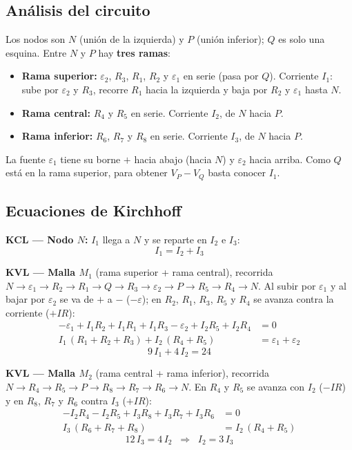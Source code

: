 \documentclass[12pt,letterpaper]{article}
\begin{document}
\subsection*{An\'alisis del circuito}

Los nodos son $N$ (uni\'on de la izquierda) y $P$ (uni\'on inferior); $Q$ es solo una esquina.
Entre $N$ y $P$ hay \textbf{tres ramas}:
\begin{itemize}\setlength\itemsep{1pt}
    \item \textbf{Rama superior:} $\varepsilon_2$, $R_3$, $R_1$, $R_2$ y $\varepsilon_1$ en serie
          (pasa por $Q$). Corriente $I_1$: sube por $\varepsilon_2$ y $R_3$, recorre $R_1$ hacia la
          izquierda y baja por $R_2$ y $\varepsilon_1$ hasta $N$.
    \item \textbf{Rama central:} $R_4$ y $R_5$ en serie. Corriente $I_2$, de $N$ hacia $P$.
    \item \textbf{Rama inferior:} $R_6$, $R_7$ y $R_8$ en serie. Corriente $I_3$, de $N$ hacia $P$.
\end{itemize}
La fuente $\varepsilon_1$ tiene su borne $+$ hacia abajo (hacia $N$) y $\varepsilon_2$ hacia arriba.
Como $Q$ est\'a en la rama superior, para obtener $V_P - V_Q$ basta conocer $I_1$.

\subsection*{Ecuaciones de Kirchhoff}

\textbf{KCL --- Nodo $N$:} $I_1$ llega a $N$ y se reparte en $I_2$ e $I_3$:
\[
    \boxed{I_1 = I_2 + I_3} \tag{N}
\]

\textbf{KVL --- Malla $M_1$} (rama superior + rama central), recorrida
$N\to\varepsilon_1\to R_2\to R_1\to Q\to R_3\to\varepsilon_2\to P\to R_5\to R_4\to N$. Al subir por
$\varepsilon_1$ y al bajar por $\varepsilon_2$ se va de $+$ a $-$ ($-\varepsilon$); en $R_2$, $R_1$,
$R_3$, $R_5$ y $R_4$ se avanza contra la corriente ($+IR$):
\begin{align*}
    -\varepsilon_1 + I_1R_2 + I_1R_1 + I_1R_3 - \varepsilon_2 + I_2R_5 + I_2R_4 &= 0\\[2pt]
    I_1\,(R_1+R_2+R_3) + I_2\,(R_4+R_5) &= \varepsilon_1 + \varepsilon_2
\end{align*}
\[
    \boxed{9\,I_1 + 4\,I_2 = 24} \tag{M1}
\]

\textbf{KVL --- Malla $M_2$} (rama central + rama inferior), recorrida
$N\to R_4\to R_5\to P\to R_8\to R_7\to R_6\to N$. En $R_4$ y $R_5$ se avanza con $I_2$ ($-IR$) y en
$R_8$, $R_7$ y $R_6$ contra $I_3$ ($+IR$):
\begin{align*}
    -I_2R_4 - I_2R_5 + I_3R_8 + I_3R_7 + I_3R_6 &= 0\\[2pt]
    I_3\,(R_6+R_7+R_8) &= I_2\,(R_4+R_5)
\end{align*}
\[
    \boxed{12\,I_3 = 4\,I_2 \;\;\Rightarrow\;\; I_2 = 3\,I_3} \tag{M2}
\]
\end{document}
